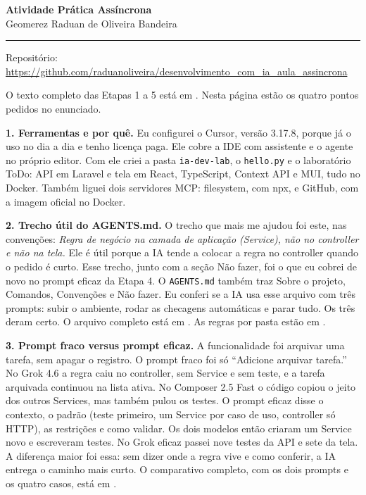 \documentclass[12pt,a4paper]{article}
\begin{document}
\begin{center}
{\bfseries Atividade Prática Assíncrona}\\
Geomerez Raduan de Oliveira Bandeira
\end{center}

\vspace{0.15em}
\hrule
\vspace{0.4em}

Repositório: \url{https://github.com/raduanoliveira/desenvolvimento_com_ia_aula_assincrona}

O texto completo das Etapas 1 a 5 está em . Nesta página estão os quatro pontos pedidos no enunciado.

\textbf{1. Ferramentas e por quê.} Eu configurei o Cursor, versão 3.17.8, porque já o uso no dia a dia e tenho licença paga. Ele cobre a IDE com assistente e o agente no próprio editor. Com ele criei a pasta \texttt{ia-dev-lab}, o \texttt{hello.py} e o laboratório ToDo: API em Laravel e tela em React, TypeScript, Context API e MUI, tudo no Docker. Também liguei dois servidores MCP: filesystem, com npx, e GitHub, com a imagem oficial no Docker.

\textbf{2. Trecho útil do AGENTS.md.} O trecho que mais me ajudou foi este, nas convenções: \emph{Regra de negócio na camada de aplicação (Service), não no controller e não na tela.} Ele é útil porque a IA tende a colocar a regra no controller quando o pedido é curto. Esse trecho, junto com a seção Não fazer, foi o que eu cobrei de novo no prompt eficaz da Etapa 4. O \texttt{AGENTS.md} também traz Sobre o projeto, Comandos, Convenções e Não fazer. Eu conferi se a IA usa esse arquivo com três prompts: subir o ambiente, rodar as checagens automáticas e parar tudo. Os três deram certo. O arquivo completo está em . As regras por pasta estão em .

\textbf{3. Prompt fraco versus prompt eficaz.} A funcionalidade foi arquivar uma tarefa, sem apagar o registro. O prompt fraco foi só ``Adicione arquivar tarefa.'' No Grok 4.6 a regra caiu no controller, sem Service e sem teste, e a tarefa arquivada continuou na lista ativa. No Composer 2.5 Fast o código copiou o jeito dos outros Services, mas também pulou os testes. O prompt eficaz disse o contexto, o padrão (teste primeiro, um Service por caso de uso, controller só HTTP), as restrições e como validar. Os dois modelos então criaram um Service novo e escreveram testes. No Grok eficaz passei nove testes da API e sete da tela. A diferença maior foi essa: sem dizer onde a regra vive e como conferir, a IA entrega o caminho mais curto. O comparativo completo, com os dois prompts e os quatro casos, está em .
\end{document}
